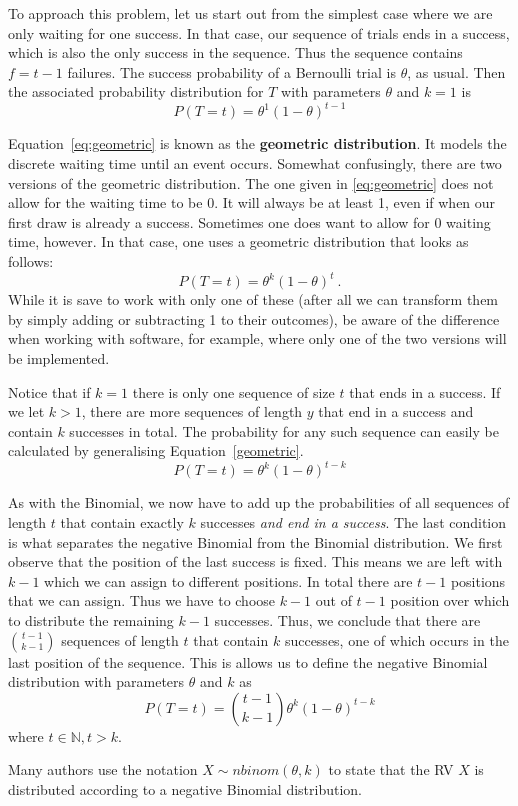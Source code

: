 To approach this problem, let us start out from the simplest case where we are only waiting for one success. In that case, our sequence of trials ends in a success,
which is also the only success in the sequence. Thus the sequence contains $ f = t-1 $ failures. The success probability of a Bernoulli trial is $ \theta $, as usual.
Then the associated probability distribution for $ T $ with parameters $ \theta $ and $ k=1 $ is
\begin{equation}\label{eq:geometric}
P(T=t) = \theta^{1} (1-\theta)^{t-1}
\end{equation}

Equation~\eqref{eq:geometric} is known as the \textbf{geometric distribution}. It models the discrete waiting time until an event occurs. Somewhat confusingly, there
are two versions of the geometric distribution. The one given in \eqref{eq:geometric} does not allow for the waiting time to be 0. It will always be at least 1, even
if when our first draw is already a success. Sometimes one does want to allow for 0 waiting time, however. In that case, one uses a geometric distribution that looks as 
follows:
\begin{equation}\label{eq:geometric}
P(T=t) = \theta^{k} (1-\theta)^{t} \ .
\end{equation}
While it is save to work with only one of these (after all we can transform them by simply adding or subtracting 1 to their outcomes), be aware of the difference when
working with software, for example, where only one of the two versions will be implemented.

Notice that if $ k=1 $ there is only one sequence of size $ t $ that ends in a success. If we let $ k>1 $, there are more sequences of length $ y $ that end in a success 
and contain $ k $ successes in total. The probability for any such sequence can easily be calculated by generalising Equation~\eqref{geometric}.
\begin{equation}
P(T=t) = \theta^{k} (1-\theta)^{t-k}
\end{equation}

As with the Binomial, we now have to add up the probabilities of all sequences of length $ t $ that contain exactly $ k $ successes \textit{and end in a success}. The
last condition is what separates the negative Binomial from the Binomial distribution. We first observe that the position of the last success is fixed. This means
we are left with $ k-1 $ which we can assign to different positions. In total there are $ t-1 $ positions that we can assign. Thus we have to choose $ k-1 $ out
of $ t-1 $ position over which to distribute the remaining $ k-1 $ successes. Thus, we conclude that there are $ \binom{t-1}{k-1} $ sequences of length $ t $ that
contain $ k $ successes, one of which occurs in the last position of the sequence. This is allows us to define the negative Binomial distribution with parameters 
$ \theta $ and $ k $ as
\begin{equation}
P(T=t) = \binom{t-1}{k-1} \theta^{k} (1-\theta)^{t-k}
\end{equation}
where $ t \in \mathbb{N}, t > k $.

Many authors use the notation $ X \sim nbinom(\theta, k) $ to state that the RV $ X $ is distributed according to a negative Binomial distribution.



